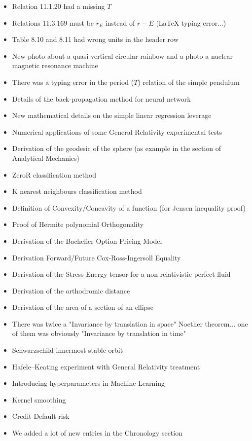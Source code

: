 \documentclass[12pt,a4paper,twoside,openright]{report}
\theoremstyle{definition}
\theoremstyle{itexmp}
\numberwithin{equation}{section}
\begin{document}
\begin{itemize}
\begin{itemize}[noitemsep]
			\item Relation 11.1.20 had a missing $T$
			\item Relations 11.3.169 must be $r_E$ instead of $r-E$ (LaTeX typing error...)
			\item Table 8.10 and 8.11 had wrong units in the header row
			\item New photo about a quasi vertical circular rainbow and a photo a nuclear magnetic resonance machine
			\item There was a typing error in the period ($T$) relation of the simple pendulum
			\item Details of the back-propagation method for neural network
			\item New mathematical details on the simple linear regression leverage
			\item Numerical applications of some General Relativity experimental tests
			\item Derivation of the geodesic of the sphere (as example in the section of Analytical Mechanics)
			\item ZeroR classification method
			\item K nearest neighbours classification method
			\item Definition of Convexity/Concavity of a function (for Jensen inequality proof)
			\item Proof of  Hermite polynomial Orthogonality
			\item Derivation of the Bachelier Option Pricing Model
			\item Derivation Forward/Future Cox-Ross-Ingersoll Equality
			\item Derivation of the Stress-Energy tensor for a non-relativistic perfect fluid
			\item Derivation of the orthodromic distance
			\item Derivation of the area of a section of an ellipse
			\item There was twice a "Invariance by translation in space" Noether theorem... one of them was obviously "Invariance by translation in time"
			\item Schwarzschild innermost stable orbit
			\item Hafele–Keating experiment with General Relativity treatment
			\item Introducing hyperparameters in Machine Learning
			\item Kernel smoothing
			\item Credit Default risk
			\item We added a lot of new entries in the Chronology section

\end{itemize}
\end{itemize}
\end{document}
